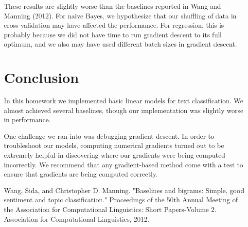 \documentclass[11pt]{article}
\begin{document}
These results are slightly worse than the baselines reported in Wang and Manning (2012). For naive Bayes, we hypothesize that our shuffling of data in cross-validation may have affected the performance. For regression, this is probably because we did not have time to run gradient descent to its full optimum, and we also may have used different batch sizes in gradient descent.




\section{Conclusion}


In this homework we implemented basic linear models for text classification. We almost achieved several baselines, though our implementation was slightly worse in performance.

One challenge we ran into was debugging gradient descent. In order to troubleshoot our models, computing numerical gradients turned out to be extremely helpful in discovering where our gradients were being computed incorrectly. We recommend that any gradient-based method come with a test to ensure that gradients are being computed correctly.



Wang, Sida, and Christopher D. Manning. "Baselines and bigrams: Simple, good sentiment and topic classification." Proceedings of the 50th Annual Meeting of the Association for Computational Linguistics: Short Papers-Volume 2. Association for Computational Linguistics, 2012.
\end{document}
